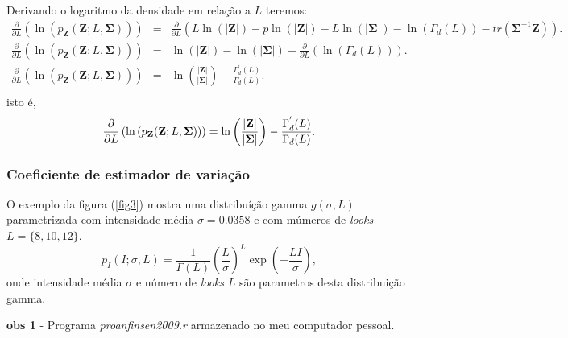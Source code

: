 \documentclass[12pt,a4paper]{article}
\begin{document}
Derivando o logaritmo da densidade em relação a $L$ teremos:
\begin{equation}\label{eqn96}
\begin{array}{ccc}
	\frac{\partial}{\partial L}\left(\ln{\left(p_{\mathbf{Z}}(\mathbf{Z};L,\mathbf{\Sigma})\right)}\right)&=&\frac{\partial}{\partial L}\left(L\ln{\left(|\mathbf{Z}|\right)}-p\ln{\left(|\mathbf{Z}|\right)} - L\ln{\left(|\mathbf{\Sigma}|\right)}-\ln{\left(\Gamma_d(L)\right)}-tr(\mathbf{\Sigma}^{-1}\mathbf{Z})\right). \\
	\frac{\partial}{\partial L}\left(\ln{\left(p_{\mathbf{Z}}(\mathbf{Z};L,\mathbf{\Sigma})\right)}\right)&=&\ln{\left(|\mathbf{Z}|\right)} - \ln{\left(|\mathbf{\Sigma}|\right)}-\frac{\partial}{\partial L}\left(\ln{\left(\Gamma_d(L)\right)}\right). \\
	\frac{\partial}{\partial L}\left(\ln{\left(p_{\mathbf{Z}}(\mathbf{Z};L,\mathbf{\Sigma})\right)}\right)&=&\ln{\left(\frac{|\mathbf{Z}|}{|\mathbf{\Sigma}|}\right)} - \frac{\Gamma^{'}_d(L)}{\Gamma_d(L)}. \\
\end{array}
\end{equation}
isto é, 
\begin{equation}\label{eqn97}
	\frac{\partial}{\partial L}\left(\ln{\left(p_{\mathbf{Z}}(\mathbf{Z};L,\mathbf{\Sigma})\right)}\right)=\ln{\left(\frac{|\mathbf{Z}|}{|\mathbf{\Sigma}|}\right)} - \frac{\Gamma^{'}_d(L)}{\Gamma_d(L)}. \\
\end{equation}
\subsubsection{Coeficiente de estimador de variação}

O exemplo da figura (\ref{fig3}) mostra uma distribuíção gamma $g(\sigma, L)$ parametrizada com intensidade média $\sigma=0.0358$ e com múmeros de {\it looks} $L=\{8,10,12\}$.
\begin{equation}\label{eqn98}
	p_{I}(I;\sigma,L)=\frac{1}{\Gamma(L)}\left(\frac{L}{\sigma}\right)^L \exp(-\frac{LI}{\sigma}), 
\end{equation}
onde intensidade média $\sigma$ e número de {\it looks} $L$ são parametros desta distribuição gamma.

{\bf obs 1} - Programa {\it proanfinsen2009.r} armazenado no meu computador pessoal.
\end{document}

